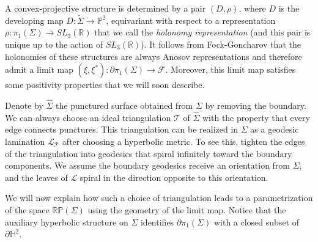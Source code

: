 \documentclass{amsart}
\theoremstyle{remark}
\theoremstyle{definition}
\begin{document}
A convex-projective structure is determined by a pair $(D,\rho)$, where $D$ is the developing map $D: \widetilde{\Sigma} \rightarrow \mathbb{P}^2$, equivariant with respect to a representation $\rho: \pi_1 (\Sigma) \rightarrow SL_3 (\mathbb{R})$ that we call the \emph{holonomy representation} (and this pair is unique up to the action of $SL_3 (\mathbb{R})$).
It follows from Fock-Goncharov that the holonomies of these structures are always Anosov representations and therefore admit a limit map $(\xi,\xi^*): \partial \pi_1 (\Sigma) \rightarrow \mathcal{F}$.
Moreover, this limit map satisfies some positivity properties that we will soon describe.

Denote by $\hat{\Sigma}$ the punctured surface obtained from $\Sigma$ by removing the boundary.
We can always choose an ideal triangulation $\mathcal{T}$ of $\hat{\Sigma}$ with the property that every edge connects punctures.
This triangulation can be realized in $\Sigma$ as a geodesic lamination $\mathcal{L}_\mathcal{T}$ after choosing a hyperbolic metric. 
To see this, tighten the edges of the triangulation into geodesics that spiral infinitely toward the boundary components. 
We assume the boundary geodesics receive an orientation from $\Sigma$, and the leaves of $\mathcal{L}$ spiral in the direction opposite to this orientation.

We will now explain how such a choice of triangulation leads to a parametrization of the space $\mathbb{RP} (\Sigma)$ using the geometry of the limit map.
Notice that the auxiliary hyperbolic structure on $\Sigma$ identifies $\partial \pi_1 (\Sigma)$ with a closed subset of $\partial \mathbb{H}^2$.
\end{document}
